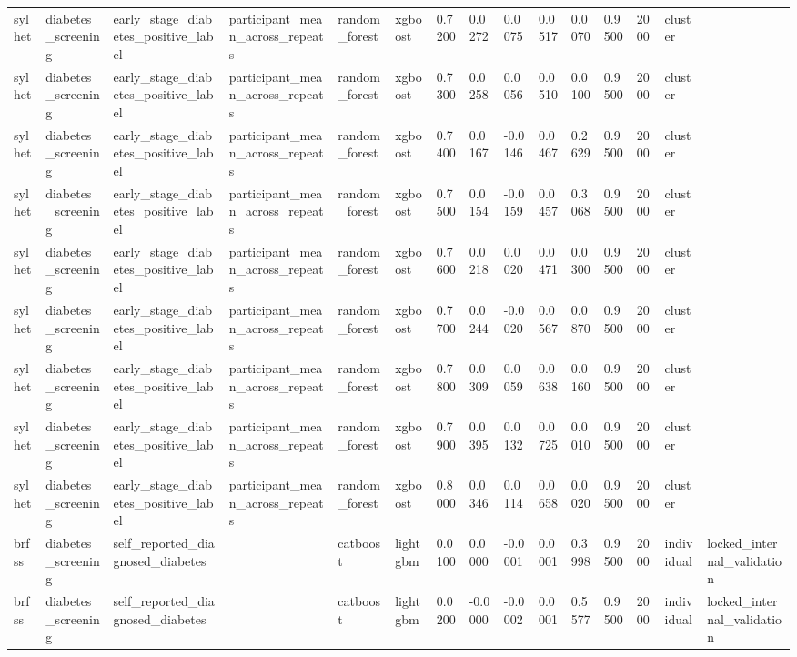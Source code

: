 \begin{tabular}{lllllllllllllll}
sylhet & diabetes\_screening & early\_stage\_diabetes\_positive\_label & participant\_mean\_across\_repeats & random\_forest & xgboost & 0.7200 & 0.0272 & 0.0075 & 0.0517 & 0.0070 & 0.9500 & 2000 & cluster &  \\
sylhet & diabetes\_screening & early\_stage\_diabetes\_positive\_label & participant\_mean\_across\_repeats & random\_forest & xgboost & 0.7300 & 0.0258 & 0.0056 & 0.0510 & 0.0100 & 0.9500 & 2000 & cluster &  \\
sylhet & diabetes\_screening & early\_stage\_diabetes\_positive\_label & participant\_mean\_across\_repeats & random\_forest & xgboost & 0.7400 & 0.0167 & -0.0146 & 0.0467 & 0.2629 & 0.9500 & 2000 & cluster &  \\
sylhet & diabetes\_screening & early\_stage\_diabetes\_positive\_label & participant\_mean\_across\_repeats & random\_forest & xgboost & 0.7500 & 0.0154 & -0.0159 & 0.0457 & 0.3068 & 0.9500 & 2000 & cluster &  \\
sylhet & diabetes\_screening & early\_stage\_diabetes\_positive\_label & participant\_mean\_across\_repeats & random\_forest & xgboost & 0.7600 & 0.0218 & 0.0020 & 0.0471 & 0.0300 & 0.9500 & 2000 & cluster &  \\
sylhet & diabetes\_screening & early\_stage\_diabetes\_positive\_label & participant\_mean\_across\_repeats & random\_forest & xgboost & 0.7700 & 0.0244 & -0.0020 & 0.0567 & 0.0870 & 0.9500 & 2000 & cluster &  \\
sylhet & diabetes\_screening & early\_stage\_diabetes\_positive\_label & participant\_mean\_across\_repeats & random\_forest & xgboost & 0.7800 & 0.0309 & 0.0059 & 0.0638 & 0.0160 & 0.9500 & 2000 & cluster &  \\
sylhet & diabetes\_screening & early\_stage\_diabetes\_positive\_label & participant\_mean\_across\_repeats & random\_forest & xgboost & 0.7900 & 0.0395 & 0.0132 & 0.0725 & 0.0010 & 0.9500 & 2000 & cluster &  \\
sylhet & diabetes\_screening & early\_stage\_diabetes\_positive\_label & participant\_mean\_across\_repeats & random\_forest & xgboost & 0.8000 & 0.0346 & 0.0114 & 0.0658 & 0.0020 & 0.9500 & 2000 & cluster &  \\
brfss & diabetes\_screening & self\_reported\_diagnosed\_diabetes &  & catboost & lightgbm & 0.0100 & 0.0000 & -0.0001 & 0.0001 & 0.3998 & 0.9500 & 2000 & individual & locked\_internal\_validation \\
brfss & diabetes\_screening & self\_reported\_diagnosed\_diabetes &  & catboost & lightgbm & 0.0200 & -0.0000 & -0.0002 & 0.0001 & 0.5577 & 0.9500 & 2000 & individual & locked\_internal\_validation \\

\end{tabular}
